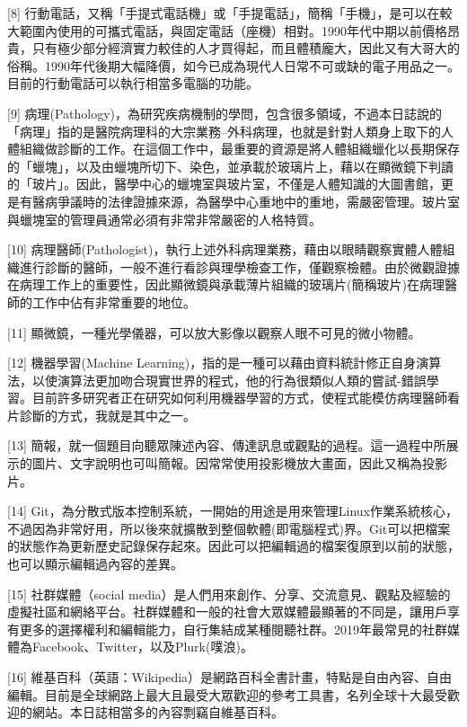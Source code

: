 \documentclass[a5paper, 12pt
]{book}
\begin{document}
{[}8{]}
行動電話，又稱「手提式電話機」或「手提電話」，簡稱「手機」，是可以在較大範圍內使用的可攜式電話，與固定電話（座機）相對。1990年代中期以前價格昂貴，只有極少部分經濟實力較佳的人才買得起，而且體積龐大，因此又有大哥大的俗稱。1990年代後期大幅降價，如今已成為現代人日常不可或缺的電子用品之一。目前的行動電話可以執行相當多電腦的功能。

{[}9{]}
病理(Pathology)，為研究疾病機制的學問，包含很多領域，不過本日誌說的「病理」指的是醫院病理科的大宗業務--外科病理，也就是針對人類身上取下的人體組織做診斷的工作。在這個工作中，最重要的資源是將人體組織蠟化以長期保存的「蠟塊」，以及由蠟塊所切下、染色，並承載於玻璃片上，藉以在顯微鏡下判讀的「玻片」。因此，醫學中心的蠟塊室與玻片室，不僅是人體知識的大圖書館，更是有醫病爭議時的法律證據來源，為醫學中心重地中的重地，需嚴密管理。玻片室與蠟塊室的管理員通常必須有非常非常嚴密的人格特質。

{[}10{]}
病理醫師(Pathologist)，執行上述外科病理業務，藉由以眼睛觀察實體人體組織進行診斷的醫師，一般不進行看診與理學檢查工作，僅觀察檢體。由於微觀證據在病理工作上的重要性，因此顯微鏡與承載薄片組織的玻璃片(簡稱玻片)在病理醫師的工作中佔有非常重要的地位。

{[}11{]} 顯微鏡，一種光學儀器，可以放大影像以觀察人眼不可見的微小物體。

{[}12{]} 機器學習(Machine
Learning)，指的是一種可以藉由資料統計修正自身演算法，以使演算法更加吻合現實世界的程式，他的行為很類似人類的嘗試-錯誤學習。目前許多研究者正在研究如何利用機器學習的方式，使程式能模仿病理醫師看片診斷的方式，我就是其中之一。

{[}13{]}
簡報，就一個題目向聽眾陳述內容、傳達訊息或觀點的過程。這一過程中所展示的圖片、文字說明也可叫簡報。因常常使用投影機放大畫面，因此又稱為投影片。

{[}14{]}
Git，為分散式版本控制系統，一開始的用途是用來管理Linux作業系統核心，不過因為非常好用，所以後來就擴散到整個軟體(即電腦程式)界。Git可以把檔案的狀態作為更新歷史記錄保存起來。因此可以把編輯過的檔案復原到以前的狀態，也可以顯示編輯過內容的差異。

{[}15{]} 社群媒體（social
media）是人們用來創作、分享、交流意見、觀點及經驗的虛擬社區和網絡平台。社群媒體和一般的社會大眾媒體最顯著的不同是，讓用戶享有更多的選擇權利和編輯能力，自行集結成某種閱聽社群。2019年最常見的社群媒體為Facebook、Twitter，以及Plurk(噗浪)。

{[}16{]}
維基百科（英語：Wikipedia）是網路百科全書計畫，特點是自由內容、自由編輯。目前是全球網路上最大且最受大眾歡迎的參考工具書，名列全球十大最受歡迎的網站。本日誌相當多的內容剽竊自維基百科。
\end{document}
